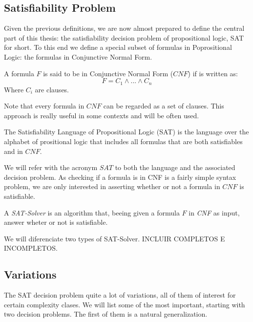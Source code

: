 \begin{definition}
\subsection{Satisfiability Problem}

Given the previous definitions, we are now almost prepared to define the central part of this thesis: the satisfiability decision problem of propositional logic, SAT for short. To this end we define a special subset of formulas in Poprositional Logic: the formulas in Conjunctive Normal Form.

\begin{definition}
      A formula $F$ is said to be in Conjunctive Normal Form ($CNF$)  if is written as:
      $$F = C_1\wedge ... \wedge C_n$$
      Where $C_i$  are clauses.
    \end{definition}

Note that every formula in $CNF$ can be regarded as a set of clauses. This approach is really useful in some contexts and will be often used.

\begin{definition}
  The Satisfiability Language of Propositional Logic (SAT) is the language over the alphabet of prositional logic that includes all formulas that are both satisfiables and in $CNF$.
\end{definition}

We will refer with the acronym $SAT$ to both the language and the associated decision problem. As checking if a formula is in CNF is a fairly simple syntax problem, we are only interested in asserting whether or not a formula in $CNF$ is satisfiable.

\begin{definition}
A \emph{SAT-Solver} is an algorithm that, beeing given a formula $F$ in \emph{CNF} as input, answer wheter or not is satisfiable.
\end{definition}

We will diferenciate two types of SAT-Solver. INCLUIR COMPLETOS E INCOMPLETOS.

\subsection{Variations}

The SAT decision problem quite a lot of variations, all of them of interest for certain complexity clases. We will list some of the most important, starting with two decision problems. The first of them is a natural generalization.


\end{definition}
